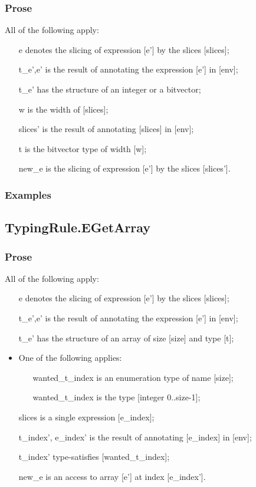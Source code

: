 \documentclass{book}
\begin{document}
  \subsubsection{Prose}
  All of the following apply:
  \begin{itemize}
  \item  [e] denotes the slicing of expression [e'] by the slices [slices];
  \item  [t\_e',e'] is the result of annotating the expression [e'] in [env];
  \item  [t\_e'] has the structure of an integer or a bitvector;
  \item  [w] is the width of [slices];
  \item  [slices'] is the result of annotating [slices] in [env];
  \item  [t] is the bitvector type of width [w];
  \item  [new\_e] is the slicing of expression [e'] by the slices [slices'].
  \end{itemize}

  \subsubsection{Examples}

\subsection{TypingRule.EGetArray}

  \subsubsection{Prose}
  All of the following apply:
  \begin{itemize}
  \item  [e] denotes the slicing of expression [e'] by the slices [slices];
  \item  [t\_e',e'] is the result of annotating the expression [e'] in [env];
  \item  [t\_e'] has the structure of an array of size [size] and type [t];
  \item  One of the following applies:
    \begin{itemize}
    \item  [wanted\_t\_index] is an enumeration type of name [size];
    \item  [wanted\_t\_index] is the type [integer {0..size-1}];
    \end{itemize}
  \item  [slices] is a single expression [e\_index];
  \item  [t\_index', e\_index'] is the result of annotating [e\_index] in [env];
  \item  [t\_index'] type-satisfies [wanted\_t\_index];
  \item  [new\_e] is an access to array [e'] at index [e\_index'].
  \end{itemize}
\end{document}
